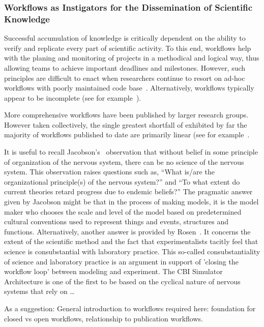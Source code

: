 \documentclass[10pt,letterpaper]{article}
\begin{document}
\subsubsection*{Workflows as Instigators for the Dissemination of Scientific Knowledge}

Successful accumulation of knowledge is critically dependent on the ability to verify and replicate every part of scientific activity. To this end, workflows help with the planing and monitoring of projects in a methodical and logical way, thus allowing teams to achieve important deadlines and milestones. However, such principles are difficult to enact when researchers continue to resort on ad-hoc workflows with poorly maintained code base~\cite{kubilius13}. Alternatively, workflows typically appear to be incomplete (see for example~\cite{eriksson22,stockton15}).

More comprehensive workflows have been published by larger research groups. However taken collectively, the single greatest shortfall of exhibited by far the majority of workflows published to date are primarily linear (see for example~\cite{evenstein,fan19}.

It is useful to recall Jacobson's~\cite{jacobson93} observation that without belief in some principle of organization of the nervous system, there can be no science of the nervous system. This observation raises questions such as, ``What is/are the organizational principle(s) of the nervous system?'' and ``To what extent do current theories retard progress due to endemic beliefs?'' The pragmatic answer given by Jacobson might be that in the process of making models, it is the model maker who chooses the scale and level of the model based on predetermined cultural conventions used to represent things and events, structures and functions. Alternatively, another answer is provided by Rosen~\cite{rosen96}. It concerns the extent of the scientific method and the fact 
that experimentalists tacitly feel that science is consubstantial with laboratory practice. This so-called consubstantiality of science and laboratory practice is an argument in support of 'closing the workflow loop' between modeling and experiment. The CBI Simulator Architecture is one of the first to be based on the cyclical nature of nervous systems that rely on \ldots

As a suggestion: General introduction to workflows required here: foundation for closed vs open workflows, relationship to publication workflows.
\end{document}
